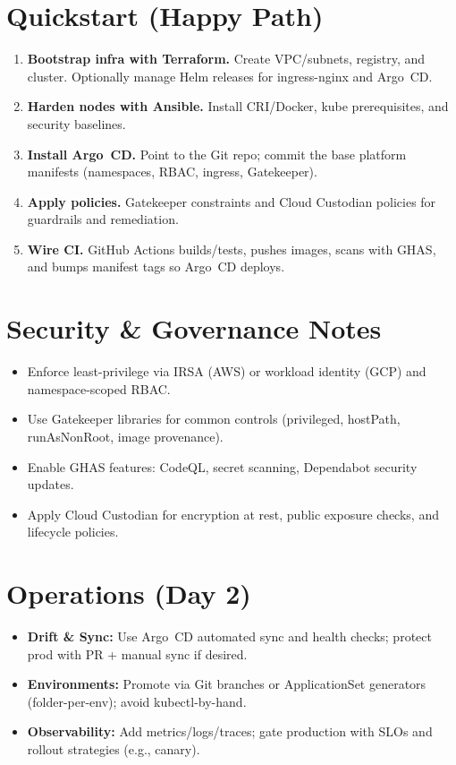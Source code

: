 \documentclass[11pt]{article}
\begin{document}
\section{Quickstart (Happy Path)}
\begin{enumerate}[leftmargin=2em,label=\textbf{Q\arabic*.}]
  \item \textbf{Bootstrap infra with Terraform.} Create VPC/subnets, registry, and cluster. Optionally manage Helm releases for ingress-nginx and Argo~CD.
  \item \textbf{Harden nodes with Ansible.} Install CRI/Docker, kube prerequisites, and security baselines.
  \item \textbf{Install Argo~CD.} Point to the Git repo; commit the base platform manifests (namespaces, RBAC, ingress, Gatekeeper).
  \item \textbf{Apply policies.} Gatekeeper constraints and Cloud Custodian policies for guardrails and remediation.
  \item \textbf{Wire CI.} GitHub Actions builds/tests, pushes images, scans with GHAS, and bumps manifest tags so Argo~CD deploys.
\end{enumerate}

\section{Security \& Governance Notes}
\begin{itemize}[leftmargin=2em]
  \item Enforce least-privilege via IRSA (AWS) or workload identity (GCP) and namespace-scoped RBAC.
  \item Use Gatekeeper libraries for common controls (privileged, hostPath, runAsNonRoot, image provenance).
  \item Enable GHAS features: CodeQL, secret scanning, Dependabot security updates.
  \item Apply Cloud Custodian for encryption at rest, public exposure checks, and lifecycle policies.
\end{itemize}

\section{Operations (Day 2)}
\begin{itemize}[leftmargin=2em]
  \item \textbf{Drift \& Sync:} Use Argo~CD automated sync and health checks; protect prod with PR + manual sync if desired.
  \item \textbf{Environments:} Promote via Git branches or ApplicationSet generators (folder-per-env); avoid kubectl-by-hand.
  \item \textbf{Observability:} Add metrics/logs/traces; gate production with SLOs and rollout strategies (e.g., canary).
\end{itemize}
\end{document}
